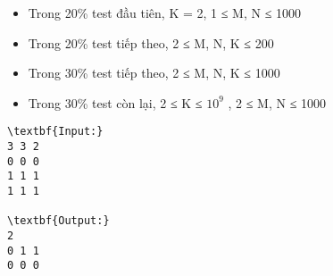 \begin{itemize}
	\item Trong 20\% test đầu tiên, K = 2, 1 ≤ M, N ≤ 1000
	\item Trong 20\% test tiếp theo, 2 ≤ M, N, K ≤ 200
	\item Trong 30\% test tiếp theo, 2 ≤ M, N, K ≤ 1000
	\item Trong 30\% test còn lại, 2 ≤ K ≤ $10^{9}$ , 2 ≤ M, N ≤ 1000
\end{itemize}
\begin{verbatim}
\textbf{Input:}
3 3 2
0 0 0
1 1 1
1 1 1

\textbf{Output:}
2
0 1 1
0 0 0\end{verbatim}